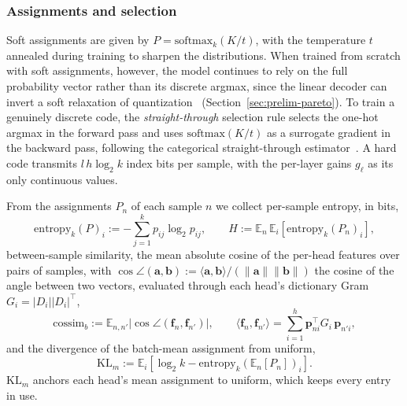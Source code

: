 \subsubsection{Assignments and selection}
\label{sec:labels}
Soft assignments are given by $P = \mathrm{softmax}_{k}(K/t)$, with the
temperature $t$ annealed during training to sharpen the distributions.
When trained from scratch with soft assignments, however, the model
continues to rely on the full probability vector rather than its discrete
argmax, since the linear decoder can invert a soft relaxation of
quantization~\cite{agustsson2017,vandenoord2017}
(Section~\ref{sec:prelim-pareto}). To
train a genuinely discrete code, the \emph{straight-through} selection
rule selects the one-hot argmax in the forward pass and uses
$\mathrm{softmax}(K/t)$ as a surrogate gradient in the backward pass,
following the categorical straight-through
estimator~\cite{bengio2013,jang2017}. A hard code transmits
$l\,h\log_2 k$ index bits per sample, with the per-layer gains $g_\ell$
as its only continuous values.

From the assignments $P_n$ of each sample $n$ we collect per-sample
entropy, in bits,
\begin{equation}
	\mathrm{entropy}_k(P)_i :=
	-\sum^{k}_{j=1}p_{ij}\log_2 p_{ij},
	\qquad
	H := \mathbb{E}_{n}\,\mathbb{E}_{i}\!\left[
	\mathrm{entropy}_k(P_n)_i\right],
	\label{eq:entropy}
\end{equation}
between-sample similarity, the mean absolute cosine of the per-head
features over pairs of samples, with
$\cos\angle(\mathbf{a}, \mathbf{b}) :=
\langle\mathbf{a},\mathbf{b}\rangle / (\lVert\mathbf{a}\rVert\lVert\mathbf{b}\rVert)$
the cosine of the angle between two vectors, evaluated through each
head's dictionary Gram $G_i = \lvert D_{i}\rvert \lvert D_{i}\rvert^{\top}$,
\begin{equation}
	\mathrm{cossim}_b :=
	\mathbb{E}_{n,n'}\big\lvert
	\cos\angle(\mathbf{f}_{n}, \mathbf{f}_{n'})
	\big\rvert,
	\qquad
	\langle \mathbf{f}_{n}, \mathbf{f}_{n'}\rangle
	= \sum^{h}_{i=1}\mathbf{p}_{ni}^{\top}G_{i}\,\mathbf{p}_{n'i},
	\label{eq:cossim_b}
\end{equation}
and the divergence of the batch-mean assignment from uniform,
\begin{equation}
	\mathrm{KL}_m := \mathbb{E}_{i}\!\left[\log_2 k -
	\mathrm{entropy}_k\!\left(\mathbb{E}_n[P_n]\right)_i\right].
	\label{eq:KL}
\end{equation}
$\mathrm{KL}_m$ anchors each head's mean assignment to uniform, which
keeps every entry in use.

